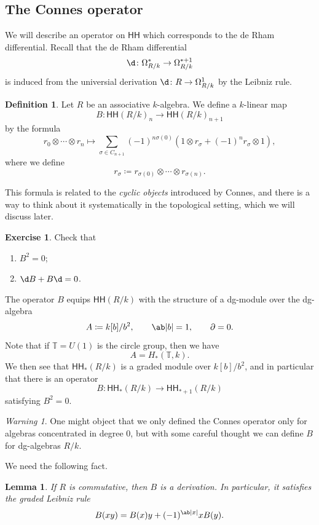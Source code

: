\documentclass[10pt, oneside]{memoir}
\newtheorem{lem}[thm]{Lemma}
\theoremstyle{definition}
\newtheorem{defn}[thm]{Definition}
\newtheorem{exer}[thm]{Exercise}
\theoremstyle{remark}
\newtheorem{warn}[thm]{Warning}
\theoremstyle{plain}
\theoremstyle{definition}
\theoremstyle{remark}
\newcommand{\T}{\mathbb{T}}
\newcommand{\ms}[1]{\mathsf{#1}}
\newcommand{\1}{\mathbf{1}}
\newcommand{\2}{\mathbf{2}}
\newcommand{\3}{\mathbf{3}}
\newcommand{\HH}{\ms{HH}}
\begin{document}
\subsection{The Connes operator}%
\label{sub:The Connes operator}

We will describe an operator on \(\HH \) which corresponds to the de Rham differential. Recall that the de Rham differential
\[ \d \colon \Omega^*_{R/k} \to \Omega^{*+1}_{R/k} \]
is induced from the universial derivation \(\d \colon R \to \Omega^1_{R/k} \) by the Leibniz rule.

\begin{defn}
    Let \(R \) be an associative \(k \)-algebra. We define a \(k \)-linear map
    \[ B \colon \HH(R/k)_n \to \HH(R/k)_{n+1} \]
    by the formula
    \[ r_0 \otimes \cdots \otimes r_n \mapsto \sum_{\sigma \in C_{n+1}} (-1)^{n\sigma(0)} (1 \otimes r_{\sigma} + (-1)^n r_{\sigma} \otimes 1), \]
    where we define
    \[ r_{\sigma} \coloneqq r_{\sigma(0)} \otimes \cdots \otimes r_{\sigma(n)}. \]
\end{defn}
This formula is related to the \textit{cyclic objects} introduced by Connes, and there is a way to think about it systematically in the topological setting, which we will discuss later.

\begin{exer}
    Check that
    \begin{enumerate}
        \item \(B^2 = 0 \);
        \item \(\d B + B \d = 0 \).
    \end{enumerate}
\end{exer}

The operator \(B \) equips \(\HH(R/k) \) with the structure of a dg-module over the dg-algebra
\[ A \coloneqq k[b]/b^2, \qquad \ab|b| = 1, \qquad \partial = 0. \]
Note that if \(\T = U(1) \) is the circle group, then we have
\[ A = H_*(\T, k). \]
We then see that \(\HH_*(R/k) \) is a graded module over \(k[b]/b^2 \), and in particular that there is an operator
\[ B \colon \HH_*(R/k) \to \HH_{*+1}(R/k) \]
satisfying \(B^2 = 0 \).

\begin{warn}
    One might object that we only defined the Connes operator only for algebras concentrated in degree \(0 \), but with some careful thought we can define \(B \) for dg-algebras \(R/k \).
\end{warn}

We need the following fact.
\begin{lem}
    If \(R \) is commutative, then \(B \) is a derivation. In particular, it satisfies the graded Leibniz rule
    \[ B(xy) = B(x) y + (-1)^{\ab|x|} x B(y). \]
\end{lem}
\end{document}
